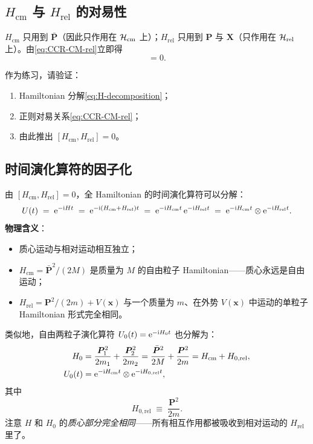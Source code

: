 \subsection{$H_{\text{cm}}$ 与 $H_{\text{rel}}$ 的对易性}

$H_{\text{cm}}$ 只用到 $\bar{\bm{P}}$（因此只作用在 $\mathcal{H}_{\text{cm}}$ 上）；$H_{\text{rel}}$ 只用到 $\bm{P}$ 与 $\bm{X}$（只作用在 $\mathcal{H}_{\text{rel}}$ 上）。由\eqref{eq:CCR-CM-rel}立即得
\begin{equation}
  [H_{\text{cm}},H_{\text{rel}}] = 0.
  \label{eq:Hcm-Hrel-commute}
\end{equation}

\begin{remark}[作业 3-1]
  作为练习，请验证：
  \begin{enumerate}
    \item Hamiltonian 分解\eqref{eq:H-decomposition}；
    \item 正则对易关系\eqref{eq:CCR-CM-rel}；
    \item 由此推出 $[H_{\text{cm}},H_{\text{rel}}]=0$。
  \end{enumerate}
\end{remark}

\subsection{时间演化算符的因子化}

由 $[H_{\text{cm}},H_{\text{rel}}]=0$，全 Hamiltonian 的时间演化算符可以分解：
\begin{equation}
  U(t) \;=\; \mathrm{e}^{-\mathrm{i} H t}
        \;=\; \mathrm{e}^{-\mathrm{i}(H_{\text{cm}}+H_{\text{rel}})t}
        \;=\; \mathrm{e}^{-\mathrm{i} H_{\text{cm}}t}\,\mathrm{e}^{-\mathrm{i} H_{\text{rel}}t}
        \;=\; \mathrm{e}^{-\mathrm{i} H_{\text{cm}}t}\otimes \mathrm{e}^{-\mathrm{i} H_{\text{rel}}t}.
  \label{eq:U-factorization}
\end{equation}
\textbf{物理含义}：
\begin{itemize}
  \item 质心运动与相对运动相互独立；
  \item $H_{\text{cm}}=\bar{\bm{P}}^2/(2M)$ 是质量为 $M$ 的自由粒子 Hamiltonian——质心永远是自由运动；
  \item $H_{\text{rel}}=\bm{P}^2/(2m)+V(\bm{x})$ 与一个质量为 $m$、在外势 $V(\bm{x})$ 中运动的单粒子 Hamiltonian 形式完全相同。
\end{itemize}

类似地，自由两粒子演化算符 $U_0(t)=\mathrm{e}^{-\mathrm{i} H_0 t}$ 也分解为：
\begin{align}
  H_0 &= \frac{\bm{P}_1^2}{2m_1}+\frac{\bm{P}_2^2}{2m_2}
       = \frac{\bar{\bm{P}}^2}{2M}+\frac{\bm{P}^2}{2m}
       = H_{\text{cm}}+H_{0,\text{rel}}, \label{eq:H0-decomposition}\\
  U_0(t) &= \mathrm{e}^{-\mathrm{i} H_{\text{cm}}t}\otimes \mathrm{e}^{-\mathrm{i} H_{0,\text{rel}}t},
  \label{eq:U0-factorization}
\end{align}
其中
\begin{equation}
  H_{0,\text{rel}} \;\equiv\; \frac{\bm{P}^2}{2m}.
  \label{eq:H0rel}
\end{equation}
注意 $H$ 和 $H_0$ 的\emph{质心部分完全相同}——所有相互作用都被吸收到相对运动的 $H_{\text{rel}}$ 里了。

